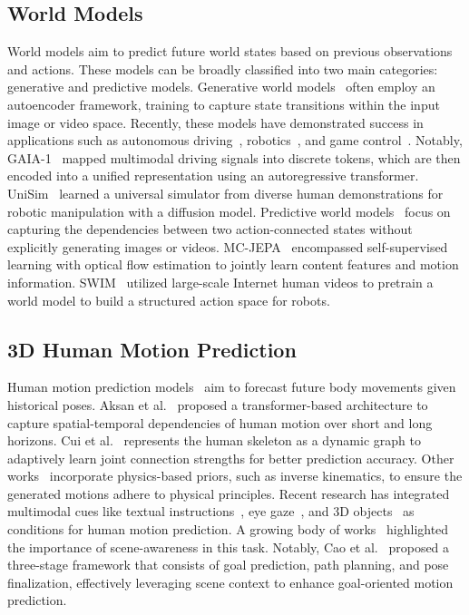 \subsection{World Models}
World models aim to predict future world states based on previous observations and actions. These models can be broadly classified into two main categories: generative and predictive models.
Generative world models~\cite{ha2018world,alonso2024diffusion,xiang2024pandora} often employ an autoencoder framework, training to capture state transitions within the input image or video space.
Recently, these models have demonstrated success in applications such as autonomous driving~\cite{wang2024driving}, robotics~\cite{ha2018recurrent}, and game control~\cite{bamford2020neural}. 
Notably, GAIA-1~\cite{hu2023gaia} mapped multimodal driving signals into discrete tokens, which are then encoded into a unified representation using an autoregressive transformer.
UniSim~\cite{yang2023learning} learned a universal simulator from diverse human demonstrations for robotic manipulation with a diffusion model. 
Predictive world models~\cite{lecun2022path,assran2023self,bardes2024revisiting,garrido2024learning} focus on capturing the dependencies between two action-connected states without explicitly generating images or videos.
MC-JEPA~\cite{bardes2023mc} encompassed self-supervised learning with optical flow estimation to jointly learn content features and motion information.
SWIM~\cite{mendonca2023structured} utilized large-scale Internet human videos
to pretrain a world model to build a structured action space for robots.


\subsection{3D Human Motion Prediction}
Human motion prediction models~\cite{liu2021aggregated,xue2020location,wang2021pvred} aim to forecast future body movements given historical poses.
Aksan et al.~\cite{aksan2021spatio} proposed a transformer-based architecture 
to capture spatial-temporal dependencies of human motion
over short and long horizons. Cui et al.~\cite{cui2020learning} 
represents the human skeleton as a dynamic graph to adaptively learn joint connection strengths for better prediction accuracy.
Other works~\cite{maeda2022motionaug,zhang2024incorporating} incorporate physics-based priors, such as inverse kinematics, to ensure the generated motions adhere to physical principles. 
Recent research has integrated multimodal cues like textual instructions~\cite{mao2022weakly}, eye gaze~\cite{zheng2022gimo}, and 3D objects~\cite{yan2024forecasting} as conditions for human motion prediction.
A growing body of works~\cite{corona2020context,hassan2021stochastic,wang2021scene} highlighted the importance of scene-awareness in this task. Notably, Cao et al.~\cite{cao2020long} proposed a three-stage framework that consists of goal prediction, path planning, and pose finalization, effectively leveraging scene context to enhance goal-oriented motion prediction.
